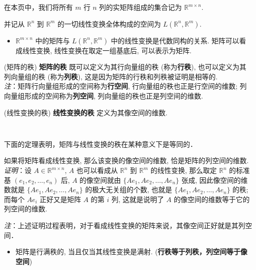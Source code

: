 
在本页中，我们将所有 $m$ 行 $n$ 列的实矩阵组成的集合记为 $\mathbb{R}^{m\times n}.$

并记从 $\mathbb{R}^{n}$ 到 $\mathbb{R}^{m}$ 的一切线性变换全体构成的空间为 $L(\mathbb{R}^{n},\mathbb{R}^{m}).$
\begin{itemize}
\item $\mathbb{R}^{m\times n}$ 中的矩阵与 $L(\mathbb{R}^{n},\mathbb{R}^{m})$
中的线性变换是代数同构的关系. 矩阵可以看成线性变换, 线性变换在取定一组基底后, 可以表示为矩阵. 
\end{itemize}

\begin{definition}{(矩阵的秩)}
\textbf{矩阵的秩} 既可以定义为其行向量组的秩 (称为\textbf{行秩}), 也可以定义为其列向量组的秩 (称为\textbf{列秩}),
这是因为矩阵的行秩和列秩被证明是相等的. \\

\textsl{注}：矩阵行向量组形成的空间称为\textbf{行空间}, 行向量组的秩也正是行空间的维数;
列向量组形成的空间称为\textbf{列空间}, 列向量组的秩也正是列空间的维数.
\end{definition}



\begin{definition}{(线性变换的秩)}
\textbf{线性变换的秩} 定义为其像空间的维数.
\end{definition} 
\verb| |

下面的定理表明，矩阵与线性变换的秩在某种意义下是等同的．
\begin{theorem}{}
 如果将矩阵看成线性变换, 那么该变换的像空间的维数, 恰是矩阵的列空间的维数.\\

\textsl{ 证明}：设 $A\in\mathbb{R}^{m\times n}$, $A$ 也可以看成从 $\mathbb{R}^{n}$ 到 $\mathbb{R}^{m}$
的线性变换, 那么取定 $\mathbb{R}^{n}$ 的标准基 $(e_{1},e_{2},\ldots,e_{n})$ 后,
$A$ 的像空间就由 $\{Ae_{1},Ae_{2},\ldots,Ae_{n}\}$ 张成, 因此像空间的维数就是 $\{Ae_{1},Ae_{2},\ldots,Ae_{n}\}$
的极大无关组的个数, 也就是 $\{Ae_{1},Ae_{2},\ldots,Ae_{n}\}$ 的秩; 而每个 $Ae_{i}$
正好又是矩阵 $A$ 的第 $i$ 列, 这就是说明了 $A$ 的像空间的维数等于它的列空间的维数. 
\end{theorem}

\textsl{注}：上述证明过程表明，对于看成线性变换的矩阵来说，其像空间正好就是其列空间． 

\begin{itemize}
\item 矩阵是行满秩的, 当且仅当其线性变换是满射. (\textbf{行秩等于列秩，列空间等于像空间})
\end{itemize}

